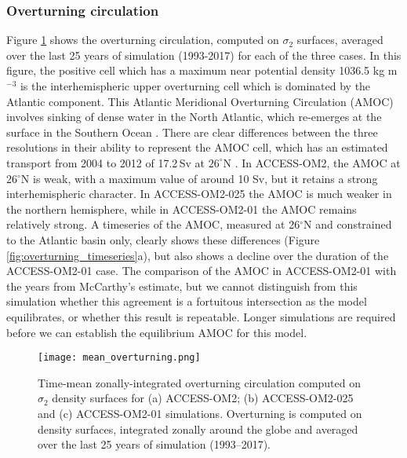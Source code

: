\documentclass[gmd, manuscript]{copernicus}
\begin{document}
\subsubsection{Overturning circulation}
Figure \ref{fig:overturning} shows the overturning circulation, computed on $\sigma_2$ surfaces, averaged over the last 25 years of simulation (1993-2017) for each of the three cases.
In this figure, the positive cell which has a maximum near potential density 1036.5 kg m$^{-3}$ is the interhemispheric upper overturning cell which is dominated by the Atlantic component.
This Atlantic Meridional Overturning Circulation (AMOC) involves sinking of dense water in the North Atlantic, which re-emerges at the surface in the Southern Ocean \citep{MarshallSpeer2012a}. 
There are clear differences between the three resolutions in their ability to represent the AMOC cell, which has an estimated transport from 2004 to 2012 of 17.2\,Sv at $26^\circ$N \citep{McCarthy:2015}.
In ACCESS-OM2, the AMOC at 26$^\circ$N is weak, with a maximum value of around 10 Sv, but it retains a strong interhemispheric character. 
In ACCESS-OM2-025 the AMOC is much weaker in the northern hemisphere, while in ACCESS-OM2-01 the AMOC remains relatively strong.
A timeseries of the AMOC, measured at 26$^\circ$N and constrained to the Atlantic basin only, clearly shows these differences (Figure \ref{fig:overturning_timeseries}a), but also shows a decline over the duration of the ACCESS-OM2-01 case.
The comparison of the AMOC in ACCESS-OM2-01 with the years from McCarthy's estimate, but we cannot distinguish from this simulation whether this agreement is a fortuitous intersection as the model equilibrates, or whether this result is repeatable.
Longer simulations are required before we can establish the equilibrium AMOC for this model.

\begin{figure}[t]
\texttt{[image: mean\_overturning.png]}
\caption{Time-mean zonally-integrated overturning circulation computed on $\sigma_2$ density surfaces for (a) ACCESS-OM2; (b) ACCESS-OM2-025 and (c) ACCESS-OM2-01 simulations. Overturning is computed on density surfaces, integrated zonally around the globe and averaged over the last 25 years of simulation (1993--2017). \label{fig:overturning}}
\end{figure}
\end{document}
